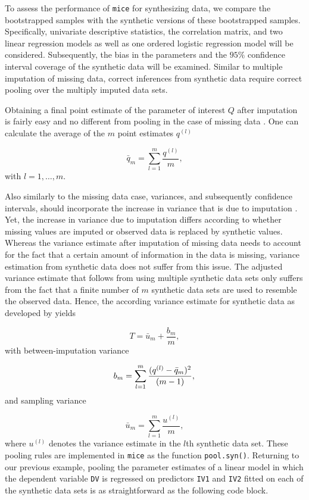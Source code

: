 \documentclass[psych,article,submit,moreauthors,pdftex]{mdpi}
\begin{document}
To assess the performance of \texttt{mice} for synthesizing data, we
compare the bootstrapped samples with the synthetic versions of these
bootstrapped samples. Specifically, univariate descriptive statistics,
the correlation matrix, and two linear regression models as well as one
ordered logistic regression model will be considered. Subsequently, the
bias in the parameters and the \(95\%\) confidence interval coverage of
the synthetic data will be examined. Similar to multiple imputation of
missing data, correct inferences from synthetic data require correct
pooling over the multiply imputed data sets.

Obtaining a final point estimate of the parameter of interest \(Q\)
after imputation is fairly easy and no different from pooling in the
case of missing data \citep{rubin_multiple_1987}. One can calculate the
average of the \(m\) point estimates \(q^{(l)}\)

\[
\bar{q}_m = \sum_{l = 1}^m \frac{q^{(l)}}{m},
\] with \(l = 1, \dots, m\).

Also similarly to the missing data case, variances, and subsequently
confidence intervals, should incorporate the increase in variance that
is due to imputation
\citep{reiter_partially_inference_2003, drechsler_synthetic_2011}. Yet,
the increase in variance due to imputation differs according to whether
missing values are imputed or observed data is replaced by synthetic
values. Whereas the variance estimate after imputation of missing data
needs to account for the fact that a certain amount of information in
the data is missing, variance estimation from synthetic data does not
suffer from this issue. The adjusted variance estimate that follows from
using multiple synthetic data sets only suffers from the fact that a
finite number of \(m\) synthetic data sets are used to resemble the
observed data. Hence, the according variance estimate for synthetic data
as developed by \citet{reiter_partially_inference_2003} yields

\[
T = \bar{u}_m + \frac{b_m}{m},
\] with between-imputation variance

\[
b_m = \sum_{l = 1}^m \frac{(q^{(l)} - \bar{q}_m)^2}{(m - 1)}, \\
\] and sampling variance

\[
\bar{u}_m = \sum_{l = 1}^m \frac{u^{(l)}}{m},
\] where \(u^{(l)}\) denotes the variance estimate in the \(l\)th
synthetic data set. These pooling rules are implemented in \texttt{mice}
as the function \texttt{pool.syn()}. Returning to our previous example,
pooling the parameter estimates of a linear model in which the dependent
variable \texttt{DV} is regressed on predictors \texttt{IV1} and
\texttt{IV2} fitted on each of the synthetic data sets is as
straightforward as the following code block.
\end{document}
